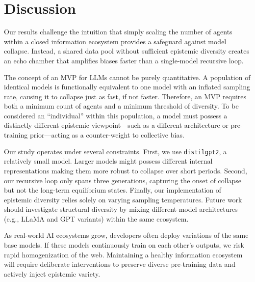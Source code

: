 \section{Discussion}
\label{sec:discussion}

Our results challenge the intuition that simply scaling the number of agents within a closed information ecosystem provides a safeguard against model collapse. Instead, a shared data pool without sufficient epistemic diversity creates an echo chamber that amplifies biases faster than a single-model recursive loop. 

 The concept of an MVP for LLMs cannot be purely quantitative. A population of identical models is functionally equivalent to one model with an inflated sampling rate, causing it to collapse just as fast, if not faster. Therefore, an MVP requires both a minimum count of agents and a minimum threshold of diversity. To be considered an ``individual'' within this population, a model must possess a distinctly different epistemic viewpoint---such as a different architecture or pre-training prior---acting as a counter-weight to collective bias.

 Our study operates under several constraints. First, we use \texttt{distilgpt2}, a relatively small model. Larger models might possess different internal representations making them more robust to collapse over short periods. Second, our recursive loop only spans three generations, capturing the onset of collapse but not the long-term equilibrium states. Finally, our implementation of epistemic diversity relies solely on varying sampling temperatures. Future work should investigate structural diversity by mixing different model architectures (e.g., LLaMA and GPT variants) within the same ecosystem.

 As real-world AI ecosystems grow, developers often deploy variations of the same base models. If these models continuously train on each other's outputs, we risk rapid homogenization of the web. Maintaining a healthy information ecosystem will require deliberate interventions to preserve diverse pre-training data and actively inject epistemic variety.
